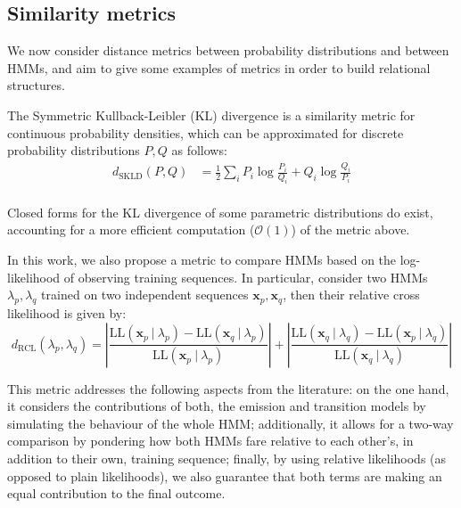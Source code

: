 \documentclass[pdftex,11pt,a4paper]{article}
\theoremstyle{definition}
\theoremstyle{remark}
\newcommand*{\V}[1]{\mathbf{#1}}%
\newcommand\given[1][]{\:#1\vert\:}
\begin{document}
\subsection{Similarity metrics}
We now consider distance metrics between probability distributions and between HMMs, and aim to give some examples of metrics in order to build relational structures.
\par The Symmetric Kullback-Leibler (KL) divergence is a similarity metric for continuous probability densities, which can be approximated for discrete probability distributions $P, Q$ as follows:
\begin{align*}
d_{\text{SKLD}}(P, Q) &= \frac{1}{2}\sum_iP_i\log{\frac{P_i}{Q_i}} + Q_i\log{\frac{Q_i}{P_i}}\\
\end{align*}
\par Closed forms for the KL divergence of some parametric distributions do exist, accounting for a more efficient computation ($\mathcal{O}(1)$) of the metric above. 
\par In this work, we also propose a metric to compare HMMs based on the log-likelihood of observing training sequences. In particular, consider two HMMs $\lambda_p, \lambda_q$ trained on two independent sequences $\V{x}_p, \V{x}_q$, then their relative cross likelihood is given by:
\begin{equation}
d_{\text{RCL}}(\lambda_p, \lambda_q) = \left\lvert\frac{\text{LL}(\V{x}_p \given \lambda_p) - \text{LL}(\V{x}_q \given \lambda_p)}{\text{LL}(\V{x}_p \given \lambda_p)}\right\rvert + \left\lvert\frac{\text{LL}(\V{x}_q \given \lambda_q) - \text{LL}(\V{x}_p \given \lambda_q)}{\text{LL}(\V{x}_q \given \lambda_q)}\right\rvert
\end{equation}
\par This metric addresses the following aspects from the literature: on the one hand, it considers the contributions of both, the emission and transition models by simulating the behaviour of the whole HMM; additionally, it allows for a two-way comparison by pondering how both HMMs fare relative to each other's, in addition to their own, training sequence; finally, by using relative likelihoods (as opposed to plain likelihoods), we also guarantee that both terms are making an equal contribution to the final outcome.
\end{document}
